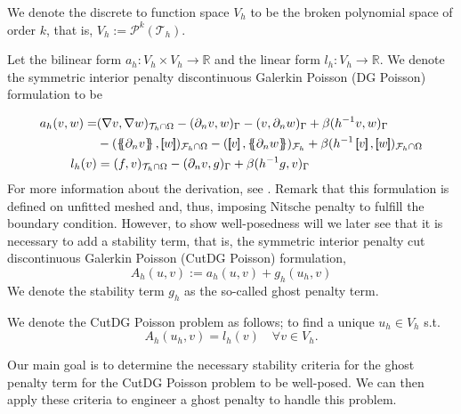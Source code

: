 
We denote the discrete to function space $V_{h}$ to be the broken polynomial space of order $k$, that is, $V_{h} := \mathcal{P}^{k}( \mathcal{T}_{h} )  $.


Let the bilinear form $a_{h}: V_{h} \times V_{h} \to \mathbb{R} $  and the linear form $l_{h}: V_{h} \to \mathbb{R} $. We denote the symmetric interior penalty discontinuous Galerkin Poisson (DG Poisson)  formulation to be

\begin{equation}
\label{eq:poisson_DG}
\begin{split}
    a_{h}( v,w)  = &( \nabla v, \nabla w)_{\mathcal{T} _{h} \cap \Omega } - ( \partial _{n} v,w)_{\Gamma } - ( v, \partial _{n} w)_{\Gamma } + \beta ( h^{-1} v,w)_{\Gamma } \\
    & - ( \mean{ \partial _{n} v }  , \jump{ w }  ) _{\mathcal{F} _{h} \cap \Omega } - ( \jump{ v }  , \mean{ \partial _{n} w }  )_{\mathcal{F} _{h}} + \beta ( h^{-1} \jump{ v }  , \jump{ w }  )_{\mathcal{F}_{h}\cap \Omega  } \\
    l_{h}( v)  &=  ( f,v) _{\mathcal{T} _{h} \cap \Omega } - ( \partial _{n} v,g) _{\Gamma } + \beta ( h^{-1} g,v)_{\Gamma }
\end{split}
\end{equation}
For more information about the derivation, see \cite[Chapter 4.2]{pietro2012}. Remark that this formulation is defined on unfitted meshed and, thus, imposing Nitsche penalty to fulfill the boundary condition.
However, to show well-posedness will we later see that it is necessary to add a stability term, that is, the symmetric interior penalty cut discontinuous Galerkin Poisson (CutDG Poisson) formulation,
\[
A_{h}( u, v) := a_{h}( u, v) + g_{h}( u_{h}, v)
\]
We denote the stability term $g_{h}$ as the so-called ghost penalty term.

\begin{definition}
We denote the CutDG Poisson problem as follows; to find a unique $u_{h} \in V_{h}$ s.t.  \[
A_{h}(u_{h}, v ) = l_{h}( v)  \quad \forall  v \in V_{h}.
\]
\end{definition}

Our main goal is to determine the necessary stability criteria for the ghost penalty term for the CutDG Poisson problem to be well-posed. We can then apply these criteria to engineer a ghost penalty to handle this problem.

